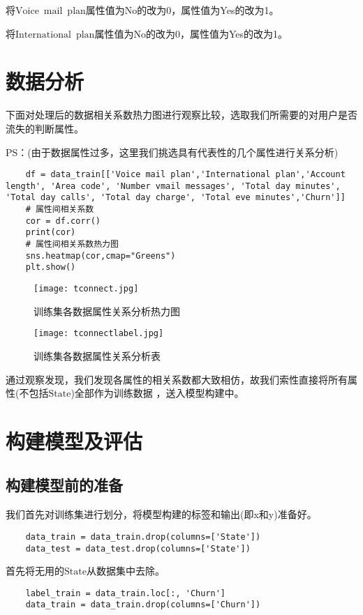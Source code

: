 \documentclass[AutoFakeBold]{LZUThesis}
\begin{document}
    将$\mathrm{Voice\enspace mail\enspace plan}$属性值为No的改为0，属性值为Yes的改为1。

    将$\mathrm{International\enspace plan}$属性值为No的改为0，属性值为Yes的改为1。

\chapter{数据分析}
下面对处理后的数据相关系数热力图进行观察比较，选取我们所需要的对用户是否流失的判断属性。

PS：(由于数据属性过多，这里我们挑选具有代表性的几个属性进行关系分析)
\begin{lstlisting}
    df = data_train[['Voice mail plan','International plan','Account length', 'Area code', 'Number vmail messages', 'Total day minutes', 'Total day calls', 'Total day charge', 'Total eve minutes','Churn']]
    # 属性间相关系数
    cor = df.corr()
    print(cor)
    # 属性间相关系数热力图
    sns.heatmap(cor,cmap="Greens")
    plt.show()
\end{lstlisting}
\begin{figure}[htbp]
    \centering
    \texttt{[image: tconnect.jpg]}
    \caption{训练集各数据属性关系分析热力图}
\end{figure}
\begin{figure}[htbp]
    \centering
    \texttt{[image: tconnectlabel.jpg]}
    \caption{训练集各数据属性关系分析表}
\end{figure}
通过观察发现，我们发现各属性的相关系数都大致相仿，故我们索性直接将所有属性(不包括$\mathrm{State}$)全部作为训练数据
，送入模型构建中。

\chapter{构建模型及评估}
\section{构建模型前的准备}
我们首先对训练集进行划分，将模型构建的标签和输出(即x和y)准备好。
\begin{lstlisting}
    data_train = data_train.drop(columns=['State'])
    data_test = data_test.drop(columns=['State'])
\end{lstlisting}

首先将无用的$\mathrm{State}$从数据集中去除。

\begin{lstlisting}
    label_train = data_train.loc[:, 'Churn']
    data_train = data_train.drop(columns=['Churn'])
\end{lstlisting}
\end{document}
